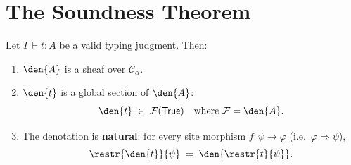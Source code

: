 \section{The Soundness Theorem}
\label{sec:soundness}

\begin{theorem}
\label{thm:soundness}
Let \(\Gamma \vdash t : A\) be a valid typing judgment.  Then:
\begin{enumerate}
\item \(\den{A}\) is a sheaf over \(\mathcal{C}_\alpha\).
\item \(\den{t}\) is a global section of \(\den{A}\):
  \[
    \den{t} \;\in\; \mathcal{F}(\mathsf{True})
    \quad\text{where } \mathcal{F} = \den{A}.
  \]
\item The denotation is \textbf{natural}: for every site morphism
  \(f : \psi \to \varphi\) (i.e.\ \(\varphi \Rightarrow \psi\)),
  \[
    \restr{\den{t}}{\psi} \;=\; \den{\restr{t}{\psi}}.
  \]
\end{enumerate}
\end{theorem}

